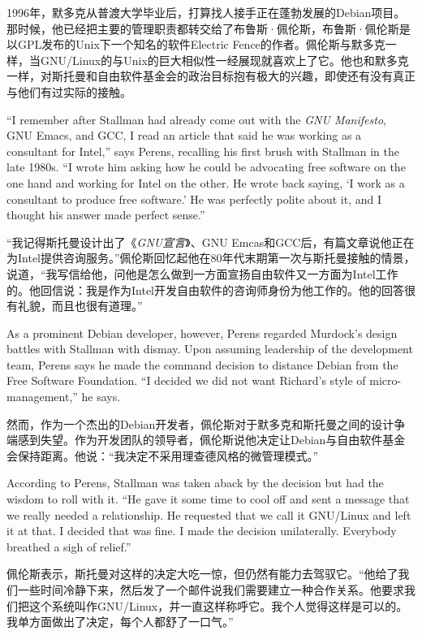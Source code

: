 \ifdefined\chs
1996年，默多克从普渡大学毕业后，打算找人接手正在蓬勃发展的Debian项目。那时候，他已经把主要的管理职责都转交给了布鲁斯·佩伦斯，布鲁斯·佩伦斯是以GPL发布的Unix下一个知名的软件Electric Fence的作者。佩伦斯与默多克一样，当GNU/Linux的与Unix的巨大相似性一经展现就喜欢上了它。他也和默多克一样，对斯托曼和自由软件基金会的政治目标抱有极大的兴趣，即使还有没有真正与他们有过实际的接触。
\fi

\ifdefined\eng
``I remember after Stallman had already come out with the \textit{GNU Manifesto}, GNU Emacs, and GCC, I read an article that said he was working as a consultant for Intel,'' says Perens, recalling his first brush with Stallman in the late 1980s. ``I wrote him asking how he could be advocating free software on the one hand and working for Intel on the other. He wrote back saying, `I work as a consultant to produce free software.' He was perfectly polite about it, and I thought his answer made perfect sense.''
\fi

\ifdefined\chs
``我记得斯托曼设计出了《\textit{GNU宣言}》、GNU Emcas和GCC后，有篇文章说他正在为Intel提供咨询服务。''佩伦斯回忆起他在80年代末期第一次与斯托曼接触的情景，说道，``我写信给他，问他是怎么做到一方面宣扬自由软件又一方面为Intel工作的。他回信说：我是作为Intel开发自由软件的咨询师身份为他工作的。他的回答很有礼貌，而且也很有道理。''
\fi

\ifdefined\eng
As a prominent Debian developer, however, Perens regarded Murdock's design battles with Stallman with dismay. Upon assuming leadership of the development team, Perens says he made the command decision to distance Debian from the Free Software Foundation. ``I decided we did not want Richard's style of micro-management,'' he says.
\fi

\ifdefined\chs
然而，作为一个杰出的Debian开发者，佩伦斯对于默多克和斯托曼之间的设计争端感到失望。作为开发团队的领导者，佩伦斯说他决定让Debian与自由软件基金会保持距离。他说：``我决定不采用理查德风格的微管理模式。''
\fi

\ifdefined\eng
According to Perens, Stallman was taken aback by the decision but had the wisdom to roll with it. ``He gave it some time to cool off and sent a message that we really needed a relationship. He requested that we call it GNU/Linux and left it at that. I decided that was fine. I made the decision unilaterally. Everybody breathed a sigh of relief.''
\fi

\ifdefined\chs
佩伦斯表示，斯托曼对这样的决定大吃一惊，但仍然有能力去驾驭它。``他给了我们一些时间冷静下来，然后发了一个邮件说我们需要建立一种合作关系。他要求我们把这个系统叫作GNU/Linux，并一直这样称呼它。我个人觉得这样是可以的。我单方面做出了决定，每个人都舒了一口气。''
\fi

